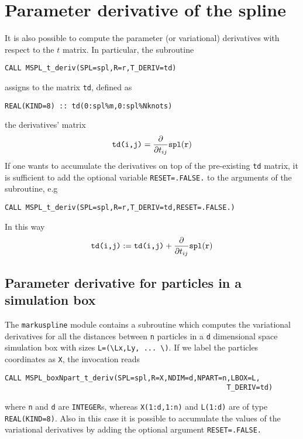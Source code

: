 \documentclass[11pt,a4paper,twoside]{article}
\begin{document}
\section{Parameter derivative of the spline}
It is also possible to compute the parameter (or variational) derivatives with respect to the $t$ matrix.
In particular, the subroutine
\begin{verbatim}
CALL MSPL_t_deriv(SPL=spl,R=r,T_DERIV=td)
\end{verbatim}
assigns to the matrix \verb+td+, defined as
\begin{verbatim}
REAL(KIND=8) :: td(0:spl%m,0:spl%Nknots)
\end{verbatim}
the derivatives' matrix
$$
\verb!td(i,j)! = \frac{\partial}{\partial t_{ij}} \verb!spl!(\verb!r!)
$$
If one wants to accumulate the derivatives on top of the pre-existing \verb+td+ matrix, it is sufficient to add the optional variable \verb+RESET=.FALSE.+ to the arguments of the subroutine, e.g
\begin{verbatim}
CALL MSPL_t_deriv(SPL=spl,R=r,T_DERIV=td,RESET=.FALSE.)
\end{verbatim}
In this way
$$
\verb!td(i,j)! := \verb!td(i,j)! + \frac{\partial}{\partial t_{ij}} \verb!spl!(\verb!r!)
$$

\subsection{Parameter derivative for particles in a simulation box}
\label{t_deriv_npart}
The \verb+markuspline+ module contains a subroutine which computes the variational derivatives for all the distances between \verb+n+ particles in a \verb+d+ dimensional space simulation box with sizes \verb+L=(\Lx,Ly, ... \)+.
If we label the particles coordinates as \verb+X+, the invocation reads
\begin{verbatim}
CALL MSPL_boxNpart_t_deriv(SPL=spl,R=X,NDIM=d,NPART=n,LBOX=L,
                                                     T_DERIV=td)
\end{verbatim}
where \verb+n+ and \verb+d+ are \verb+INTEGER+s, whereas \verb+X(1:d,1:n)+ and \verb+L(1:d)+ are of type \verb+REAL(KIND=8)+.
Also in this case it is possible to accumulate the values of the variational derivatives by adding the optional argument \verb+RESET=.FALSE.+
\end{document}
